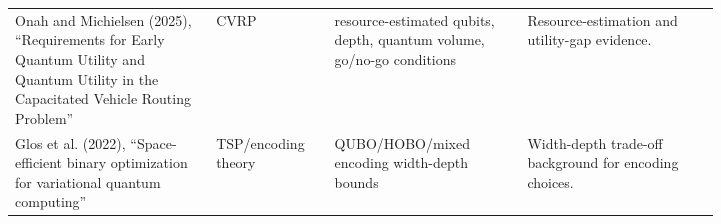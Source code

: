 \begin{longtable}{p{0.24\linewidth}p{0.12\linewidth}p{0.23\linewidth}p{0.23\linewidth}}
Onah and Michielsen (2025), ``Requirements for Early Quantum Utility and Quantum Utility in the Capacitated Vehicle Routing Problem'' & CVRP & resource-estimated qubits, depth, quantum volume, go/no-go conditions & Resource-estimation and utility-gap evidence. \\
Glos et al. (2022), ``Space-efficient binary optimization for variational quantum computing'' & TSP/encoding theory & QUBO/HOBO/mixed encoding width-depth bounds & Width-depth trade-off background for encoding choices. \\
\bottomrule
\end{longtable}
\normalsize
